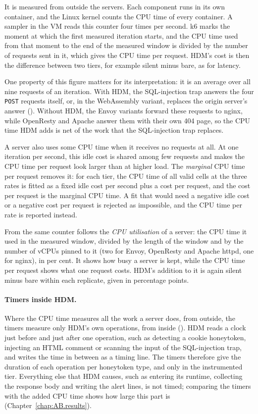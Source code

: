 \documentclass{rptuma}
\begin{document}
It is measured from outside the servers. Each component runs in its own container, and the Linux
kernel counts the CPU time of every container. A sampler in the VM reads this counter four times per second. k6 marks
the moment at which the first measured iteration starts, and the CPU time used from that moment to
the end of the measured window is divided by the number of requests sent in it, which gives the CPU
time per request. HDM's cost is then the difference between two tiers, for example silent minus
bare, as for latency.

One property of this figure matters for its interpretation: it is an average over all nine
requests of an iteration. With HDM, the SQL-injection trap answers the four \texttt{POST} requests
itself, or, in the WebAssembly variant, replaces the origin server's answer
(). Without HDM, the Envoy variants forward these requests to nginx, while OpenResty and Apache answer them with their own 404 page, so the CPU time HDM adds is net of the work
that the SQL-injection trap replaces.

A server also uses some CPU time when it receives no requests at all. At one iteration per second,
this idle cost is shared among few requests and makes the CPU time per request look larger than at
higher load. The \emph{marginal} CPU time per request removes it: for each tier, the CPU time of all
valid cells at the three rates is fitted as a fixed idle cost per second plus a cost per request,
and the cost per request is the marginal CPU time. A fit that would need a negative idle cost or a
negative cost per request is rejected as impossible, and the CPU time per rate is reported instead.

From the same counter follows the \emph{CPU utilisation} of a server: the CPU time it used in the
measured window, divided by the length of the window and by the number of vCPUs pinned to it (two
for Envoy, OpenResty and Apache httpd, one for nginx), in per cent. It shows how busy a server is
kept, while the CPU time per request shows what one request costs. HDM's addition to it is again
silent minus bare within each replicate, given in percentage points.

\paragraph{Timers inside HDM.} Where the CPU time measures all the work a server does, from
outside, the timers measure only HDM's own operations, from inside ().
HDM reads a clock just before and just after one operation, such as detecting a cookie honeytoken,
injecting an HTML comment or scanning the input of the SQL-injection trap, and writes the time in
between as a timing line. The timers therefore give the duration of each operation per honeytoken
type, and only in the instrumented tier. Everything else that HDM causes, such as entering its
runtime, collecting the response body and writing the alert lines, is not timed; comparing the
timers with the added CPU time shows how large this part is (Chapter~\ref{chap:AB.results}).
\end{document}
